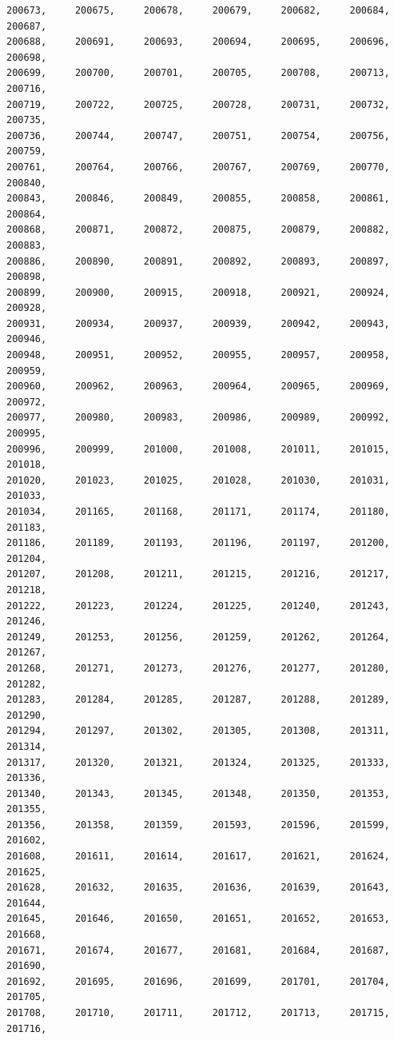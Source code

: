 \documentclass[a4paper,11pt]{report}
\begin{document}
\begin{verbatim}
200673,     200675,     200678,     200679,     200682,     200684,     200687,
200688,     200691,     200693,     200694,     200695,     200696,     200698,
200699,     200700,     200701,     200705,     200708,     200713,     200716,
200719,     200722,     200725,     200728,     200731,     200732,     200735,
200736,     200744,     200747,     200751,     200754,     200756,     200759,
200761,     200764,     200766,     200767,     200769,     200770,     200840,
200843,     200846,     200849,     200855,     200858,     200861,     200864,
200868,     200871,     200872,     200875,     200879,     200882,     200883,
200886,     200890,     200891,     200892,     200893,     200897,     200898,
200899,     200900,     200915,     200918,     200921,     200924,     200928,
200931,     200934,     200937,     200939,     200942,     200943,     200946,
200948,     200951,     200952,     200955,     200957,     200958,     200959,
200960,     200962,     200963,     200964,     200965,     200969,     200972,
200977,     200980,     200983,     200986,     200989,     200992,     200995,
200996,     200999,     201000,     201008,     201011,     201015,     201018,
201020,     201023,     201025,     201028,     201030,     201031,     201033,
201034,     201165,     201168,     201171,     201174,     201180,     201183,
201186,     201189,     201193,     201196,     201197,     201200,     201204,
201207,     201208,     201211,     201215,     201216,     201217,     201218,
201222,     201223,     201224,     201225,     201240,     201243,     201246,
201249,     201253,     201256,     201259,     201262,     201264,     201267,
201268,     201271,     201273,     201276,     201277,     201280,     201282,
201283,     201284,     201285,     201287,     201288,     201289,     201290,
201294,     201297,     201302,     201305,     201308,     201311,     201314,
201317,     201320,     201321,     201324,     201325,     201333,     201336,
201340,     201343,     201345,     201348,     201350,     201353,     201355,
201356,     201358,     201359,     201593,     201596,     201599,     201602,
201608,     201611,     201614,     201617,     201621,     201624,     201625,
201628,     201632,     201635,     201636,     201639,     201643,     201644,
201645,     201646,     201650,     201651,     201652,     201653,     201668,
201671,     201674,     201677,     201681,     201684,     201687,     201690,
201692,     201695,     201696,     201699,     201701,     201704,     201705,
201708,     201710,     201711,     201712,     201713,     201715,     201716,

\end{verbatim}
\end{document}
